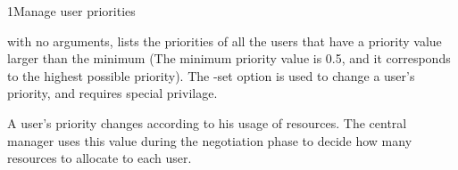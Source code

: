 \begin{ManPage}{}{1}{Manage user priorities} 
\label{man-condor-userprio}
\Synopsis {}

\Description
{} with no arguments, lists the priorities of all the users that have a priority value larger than the minimum (The minimum priority value is 0.5, and it corresponds to the highest possible priority). The -set option is used to change a user's priority, and requires special privilage.

A user's priority changes according to his usage of resources. The central manager uses this value during the negotiation phase to decide how many resources to allocate to each user.

\begin{Options}
\end{Options}

\end{ManPage}
